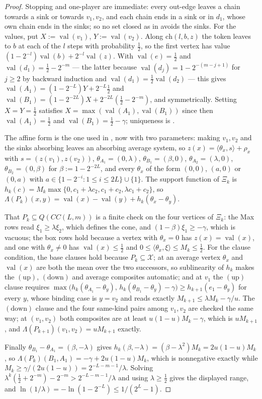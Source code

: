 \documentclass[11pt]{article}
\theoremstyle{plain}
\theoremstyle{definition}
\DeclareMathOperator{\val}{val}
\begin{document}
\begin{proof}
Stopping and one-player are immediate: every out-edge leaves a chain towards a
sink or towards $v_1,v_2$, and each chain ends in a sink or in $d_1$, whose own
chain ends in the sinks; so no set closed as in  avoids the
sinks. For the values, put $X:=\val(v_1)$, $Y:=\val(v_2)$. Along
$\mathrm{ch}(l,b,z)$ the token leaves to $b$ at each of the $l$ steps with
probability $\tfrac12$, so the first vertex has value
$(1-2^{-l})\val(b)+2^{-l}\val(z)$. With $\val(e)=\tfrac12$ and
$\val(d_1)=\tfrac12-2^{-m}$ --- the latter because $\val(d_j)=1-2^{-(m-j+1)}$
for $j\ge2$ by backward induction and $\val(d_1)=\tfrac12\val(d_2)$ --- this
gives $\val(A_1)=(1-2^{-L})Y+2^{-L}\tfrac12$ and
$\val(B_1)=(1-2^{-2L})X+2^{-2L}(\tfrac12-2^{-m})$, and symmetrically. Setting
$X=Y=\tfrac12$ satisfies $X=\max(\val(A_1),\val(B_1))$ since then
$\val(A_1)=\tfrac12$ and $\val(B_1)=\tfrac12-\gamma$; uniqueness is
.

The affine form is the one used in , now with two
parameters: making $v_1,v_2$ and the sinks absorbing leaves an absorbing average
system, so $z(x)=\langle\theta_x,s\rangle+\rho_x$ with $s=(z(v_1),z(v_2))$,
$\theta_{A_1}=(0,\lambda)$, $\theta_{B_1}=(\beta,0)$, $\theta_{A_2}=(\lambda,0)$,
$\theta_{B_2}=(0,\beta)$ for $\beta:=1-2^{-2L}$, and every $\theta_x$ of the form
$(0,0)$, $(a,0)$ or $(0,a)$ with $a\in\{1-2^{-i}:1\le i\le2L\}\cup\{1\}$. The
support function of $\Xi_k$ is
$h_k(c)=M_k\max\{0,c_1+\lambda c_2,c_1+c_2,\lambda c_1+c_2\}$, so
$\Lambda(P_k)(x,y)=\val(x)-\val(y)+h_k(\theta_x-\theta_y)$.

That $P_k\subseteq Q(CC(L,m))$ is a finite check on the four vertices of $\Xi_k$:
the Max rows read $\xi_1\ge\lambda\xi_2$, which defines the cone, and
$(1-\beta)\xi_1\ge-\gamma$, which is vacuous; the box rows hold because a vertex
with $\theta_x=0$ has $z(x)=\val(x)$, and one with $\theta_x\ne0$ has
$\val(x)\le\tfrac12$ and $0\le\langle\theta_x,\xi\rangle\le M_k\le\tfrac12$. For
the clause condition, the base clauses hold because $P_k\subseteq\mathcal X$;
at an average vertex $\theta_x$ and $\val(x)$ are both the mean over the two
successors, so sublinearity of $h_k$ makes the $(\mathrm{up})$, $(\mathrm{down})$
and average composites automatic; and at $v_1$ the $(\mathrm{up})$ clause
requires $\max\bigl(h_k(\theta_{A_1}-\theta_y),\,h_k(\theta_{B_1}-\theta_y)-\gamma\bigr)
\ge h_{k+1}(e_1-\theta_y)$ for every $y$, whose binding case is $y=v_2$ and reads
exactly $M_{k+1}\le\lambda M_k-\gamma/u$. The $(\mathrm{down})$ clause and the
four same-kind pairs among $v_1,v_2$ are checked the same way; at $(v_1,v_2)$
both composites are at least $u(1-u)M_k-\gamma$, which is $uM_{k+1}$, and
$\Lambda(P_{k+1})(v_1,v_2)=uM_{k+1}$ exactly.

Finally $\theta_{B_1}-\theta_{A_1}=(\beta,-\lambda)$ gives
$h_k(\beta,-\lambda)=(\beta-\lambda^2)M_k=2u(1-u)M_k$, so
$\Lambda(P_k)(B_1,A_1)=-\gamma+2u(1-u)M_k$, which is nonnegative exactly while
$M_k\ge\gamma/(2u(1-u))=2^{-L-m-1}/\lambda$. Solving
$\lambda^{k}(\tfrac12+2^{-m})-2^{-m}>2^{-L-m-1}/\lambda$ and using
$\lambda\ge\tfrac12$ gives the displayed range, and
$\ln(1/\lambda)=-\ln(1-2^{-L})\le1/(2^{L}-1)$.
\end{proof}
\end{document}
